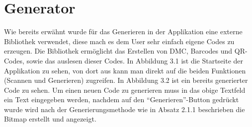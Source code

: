 \documentclass[12pt,					%
							 oneside,			%
							 a4paper,			%
							 halfparskip,		%
							 liststotoc,			%
							 bibtotoc,			%
							 fleqn,				%
							 pointlessnumbers]	%
							 {scrreprt}
\begin{document}
\section{Generator}
Wie bereits erwähnt wurde für das Generieren in der Applikation eine externe Bibliothek verwendet, diese mach es dem User sehr einfach eigene Codes zu erzeugen. Die Bibliothek ermöglicht das Erstellen von DMC, Barcodes und QR-Codes, sowie das auslesen dieser Codes. In Abbildung 3.1 ist die Startseite der Applikation zu sehen, von dort aus kann man direkt auf die beiden Funktionen (Scannen und Generieren) zugreifen. In Abbildung 3.2 ist ein bereits generierter Code zu sehen. 
Um einen neuen Code zu generieren muss in das obige Textfeld ein Text eingegeben werden, nachdem auf den ``Generieren''-Button gedrückt wurde wird nach der Generierungsmethode wie in Absatz 2.1.1 beschrieben die Bitmap erstellt und angezeigt.
\newpage
\end{document}
